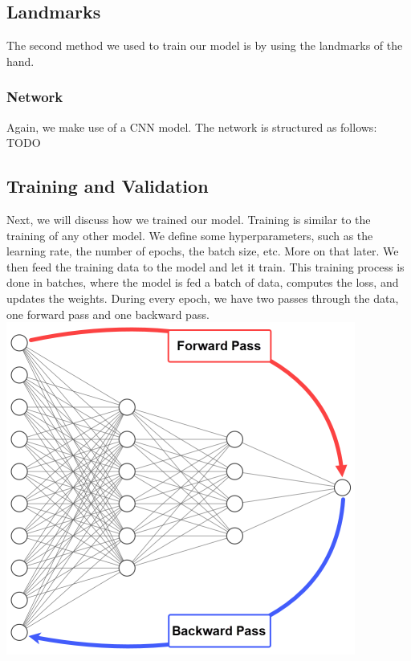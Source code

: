 \documentclass[../paper.tex]{subfiles}
\begin{document}
    \subsection{Landmarks}
    The second method we used to train our model is by using the landmarks of the hand.
    \subsubsection{Network}
    Again, we make use of a CNN model.
    The network is structured as follows:\\
    TODO

    \subsection{Training and Validation}
    Next, we will discuss how we trained our model.
    Training is similar to the training of any other model.
    We define some hyperparameters, such as the learning rate, the number of epochs, the batch size, etc.
    More on that later.
    We then feed the training data to the model and let it train.
    This training process is done in batches, where the model is fed a batch of data, computes the loss, and updates the weights.
    During every epoch, we have two passes through the data, one forward pass and one backward pass.
    \includegraphics[width=\linewidth]{Backpropagation-passes-architecture}
\end{document}
